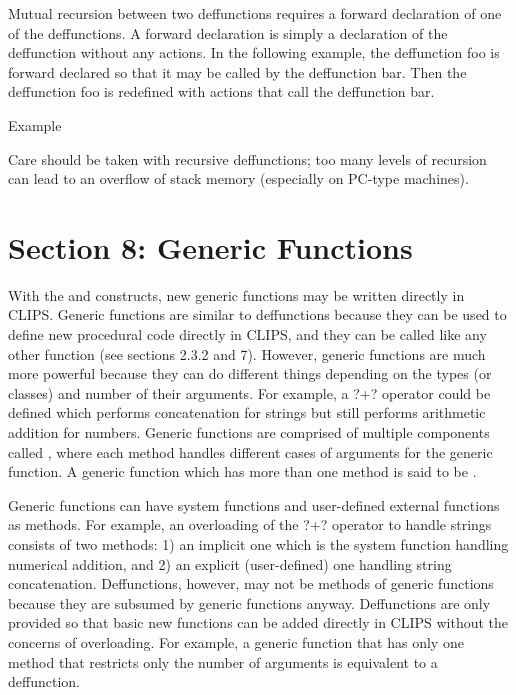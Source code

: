 \documentclass[letterpaper,10pt,english]{sphinxmanual}
\begin{document}
Mutual recursion between two deffunctions requires a forward declaration
of one of the deffunctions. A forward declaration is simply a
declaration of the deffunction without any actions. In the following
example, the deffunction foo is forward declared so that it may be
called by the deffunction bar. Then the deffunction foo is redefined
with actions that call the deffunction bar.

Example

\begin{sphinxVerbatim}[commandchars=\\\{\}]
  

  

  
\end{sphinxVerbatim}

Care should be taken with recursive deffunctions; too many levels of
recursion can lead to an overflow of stack memory (especially on PC-type
machines).

\label{\detokenize{deffunction:section-5}}

\chapter{Section 8: Generic Functions}
\label{\detokenize{generic:section-8-generic-functions}}\label{\detokenize{generic::doc}}
With the  and  constructs, new generic
functions may be written directly in CLIPS. Generic functions are
similar to deffunctions because they can be used to define new
procedural code directly in CLIPS, and they can be called like any other
function (see sections 2.3.2 and 7). However, generic functions are much
more powerful because they can do different things depending on the
types (or classes) and number of their arguments. For example, a ?+?
operator could be defined which performs concatenation for strings but
still performs arithmetic addition for numbers. Generic functions are
comprised of multiple components called , where each method
handles different cases of arguments for the generic function. A generic
function which has more than one method is said to be .

Generic functions can have system functions and user-defined external
functions as  methods. For example, an overloading of the ?+?
operator to handle strings consists of two methods: 1) an implicit one
which is the system function handling numerical addition, and 2) an
explicit (user-defined) one handling string concatenation. Deffunctions,
however, may not be methods of generic functions because they are
subsumed by generic functions anyway. Deffunctions are only provided so
that basic new functions can be added directly in CLIPS without the
concerns of overloading. For example, a generic function that has only
one method that restricts only the number of arguments is equivalent to
a deffunction.
\end{document}
